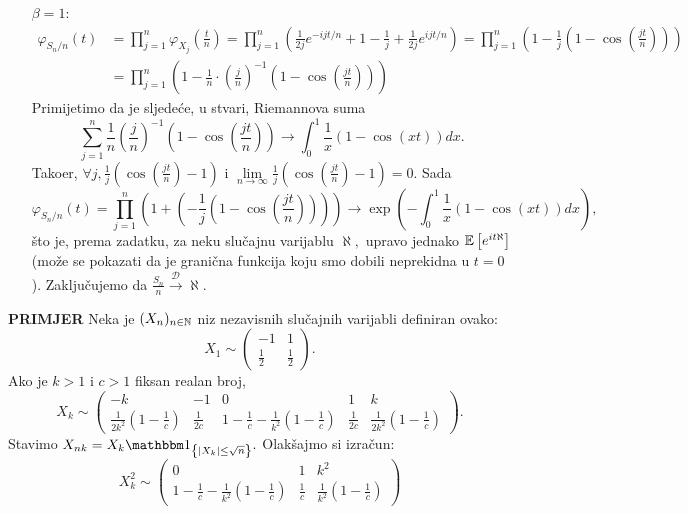 \documentclass{article}
\begin{document}
\begin{enumerate}
    \item[\(\beta=1\):] \[\begin{aligned}\varphi_{S_n/n}(t)&=\prod_{j=1}^n\varphi_{X_j}\left(\frac{t}n\right)=\prod_{j=1}^n\left(\frac1{2j}e^{-ijt/n}+1-\frac1j+\frac1{2j}e^{ijt/n}\right)=\prod_{j=1}^n\left(1-\frac1j\left(1-\cos\left(\frac{jt}n\right)\right)\right)\\&=\prod_{j=1}^n\left(1-\frac1n\cdot\left(\frac{j}n\right)^{-1}\left(1-\cos\left(\frac{jt}n\right)\right)\right)\end{aligned}\] Primijetimo da je sljedeće, u stvari, Riemannova suma \[\sum_{j=1}^n\frac1n\left(\frac{j}n\right)^{-1}\left(1-\cos\left(\frac{jt}n\right)\right)\to\int_0^1\frac1x(1-\cos(xt))dx.\] Tako\dj{}er, \(\forall j,\frac1j\left(\cos\left(\frac{jt}n\right)-1\right)\) i \(\lim\limits_{n\to\infty}\frac1j\left(\cos\left(\frac{jt}n\right)-1\right)=0.\) Sada \[\varphi_{S_n/n}(t)=\prod_{j=1}^n\left(1+\left(-\frac1j\left(1-\cos\left(\frac{jt}n\right)\right)\right)\right)\to\exp\left(-\int_0^1\frac1x(1-\cos(xt))dx\right),\] što je, prema zadatku, za neku slučajnu varijablu \(\aleph,\) upravo jednako \(\Bbb E\left[e^{it\aleph}\right]\) (može se pokazati da je granična funkcija koju smo dobili neprekidna u \(t=0\)). Zaključujemo da \(\frac{S_n}n\overset{\mathcal D}{\longrightarrow}\aleph.\)
\end{enumerate}
 \textbf{PRIMJER}\newline
 Neka je \((X_n)_{n\in\Bbb N}\) niz nezavisnih slučajnih varijabli definiran ovako: \[X_1\sim\begin{pmatrix}-1&1\\\frac12&\frac12\end{pmatrix}.\] Ako je \(k>1\) i \(c>1\) fiksan realan broj, \[X_k\sim\begin{pmatrix}-k&-1&0&1&k\\\frac1{2k^2}\left(1-\frac1c\right)&\frac1{2c}&1-\frac1c-\frac1{k^2}\left(1-\frac1c\right)&\frac1{2c}&\frac1{2k^2}\left(1-\frac1c\right)\end{pmatrix}.\] Stavimo \(X_{nk}=X_k\mathbbm 1_{\left\{|X_k|\le\sqrt n\right\}}.\) Olakšajmo si izračun: \[X_k^2\sim\begin{pmatrix}0&1&k^2\\1-\frac1c-\frac1{k^2}\left(1-\frac1c\right)&\frac1c&\frac1{k^2}\left(1-\frac1c\right)\end{pmatrix}\]
\end{document}
